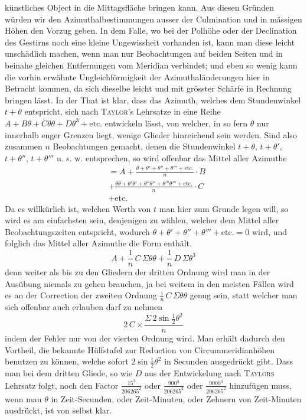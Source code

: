 künstliches Object in die Mittagsfläche bringen kann. Aus diesen Gründen würden wir den Azimuthalbestimmungen ausser der Culmination und in mässigen Höhen den Vorzug geben. In dem Falle, wo bei der Polhöhe oder der Declination des Gestirns noch eine kleine Ungewissheit vorhanden ist, kann man diese leicht unschädlich machen, wenn man nur Beobachtungen auf beiden Seiten und in beinahe gleichen Entfernungen vom Meridian verbindet; und eben so wenig kann die vorhin erwähnte Ungleichförmigkeit der Azimuthaländerungen hier in Betracht kommen, da sich dieselbe leicht und mit grösster Schärfe in Rechnung bringen lässt. In der That ist klar, dass das Azimuth, welches dem Stundenwinkel $t+\theta$ entspricht, sich nach \textsc{Taylor}'s Lehrsatze in eine Reihe $A+B\theta+C\theta\theta+D\theta^3+\text{etc.}$ entwickeln lässt, von welcher, in so fern $\theta$ nur innerhalb enger Grenzen liegt, wenige Glieder hinreichend sein werden. Sind also zusammen $n$ Beobachtungen gemacht, denen die Stundenwinkel $t+\theta$, $t+\theta'$, $t+\theta''$, $t+\theta'''$ u. s. w. entsprechen, so wird offenbar das Mittel aller Azimuthe
\[
\begin{aligned}&= A + \frac{\theta+\theta'+\theta''+\theta'''+\text{etc.}}{n}\cdot B\\[3pt]
&+ \frac{\theta\theta+\theta'\theta'+\theta''\theta''+\theta'''\theta'''+\text{etc.}}{n}\cdot C\\[3pt]
&+ \text{etc.}\end{aligned}
\]
Da es willkürlich ist, welchen Werth von $t$ man hier zum Grunde legen will, so wird es am einfachsten sein, denjenigen zu wählen, welcher dem Mittel aller Beobachtungszeiten entspricht, wodurch $\theta+\theta'+\theta''+\theta'''+\text{etc.}=0$ wird, und folglich das Mittel aller Azimuthe die Form enthält.
\[
A + \frac{1}{n}\,C\,\Sigma\theta\theta + \frac{1}{n}\,D\,\Sigma\theta^3
\]
denn weiter als bis zu den Gliedern der dritten Ordnung wird man in der Ausübung niemals zu gehen brauchen, ja bei weitem in den meisten Fällen wird es an der Correction der zweiten Ordnung $\frac{1}{n}\,C\,\Sigma\theta\theta$ genug sein, statt welcher man sich offenbar auch erlauben darf zu nehmen
\[
2\,C \times \frac{\Sigma\,2\sin\frac{1}{2}\theta^2}{n}
\]
indem der Fehler nur von der vierten Ordnung wird. Man erhält dadurch den Vortheil, die bekannte Hülfstafel zur Reduction von Circummeridianhöhen benutzen zu können, welche sofort $2\sin\frac{1}{2}\theta^2$ in Secunden ausgedrückt gibt. Dass man bei dem dritten Gliede, so wie $D$ aus der Entwickelung nach \textsc{Taylors} Lehrsatz folgt, noch den Factor $\frac{15^3}{206265^2}$ oder $\frac{900^3}{206265^2}$ oder $\frac{9000^3}{206265^2}$ hinzufügen muss, wenn man $\theta$ in Zeit-Secunden, oder Zeit-Minuten, oder Zehnern von Zeit-Minuten ausdrückt, ist von selbst klar.

